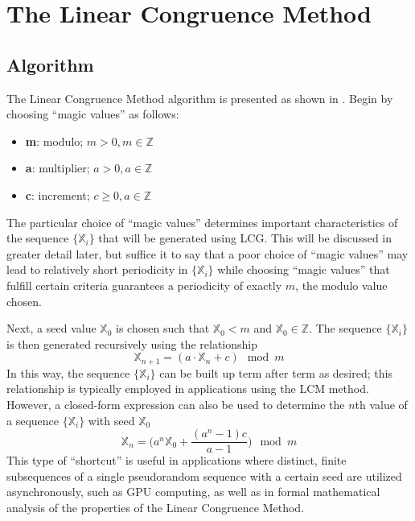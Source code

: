 \documentclass{article}
\theoremstyle{break}
\begin{document}
\section{The Linear Congruence Method}
\subsection{Algorithm}
The Linear Congruence Method algorithm is presented as shown in \autocite{hull_random_1962}. Begin by choosing ``magic values'' as follows:
\begin{itemize}
\item \textbf{m}: modulo; $m > 0, m \in \mathbb{Z}$ 
\item \textbf{a}: multiplier; $a > 0, a \in \mathbb{Z}$
\item \textbf{c}: increment; $c \geq 0, a \in \mathbb{Z}$
\end{itemize}
The particular choice of ``magic values'' determines important characteristics of the sequence $\{\mathbb{X}_i\}$ that will be generated using LCG. This will be discussed in greater detail later, but suffice it to say that a poor choice of ``magic values'' may lead to relatively short periodicity in $\{\mathbb{X}_i\}$ while choosing ``magic values'' that fulfill certain criteria guarantees a periodicity of exactly $m$, the modulo value chosen.

Next, a seed value $\mathbb{X}_0$ is chosen such that $\mathbb{X}_0 < m$ and $\mathbb{X}_0 \in \mathbb{Z}$. The sequence $\{\mathbb{X}_i\}$ is then generated recursively using the relationship
\begin{equation} \label{eq:lgp_rec_rel}
\mathbb{X}_{n+1} = (a \cdot \mathbb{X}_{n} + c) \mod m
\end{equation}
In this way, the sequence $\{\mathbb{X}_i\}$ can be built up term after term as desired; this relationship is typically employed in applications using the LCM method. However, a closed-form expression can also be used to determine the $n$th value of a sequence $\{\mathbb{X}_i\}$ with seed $\mathbb{X}_0$
\begin{equation} 
\mathbb{X}_{n} = \Big( a^n \mathbb{X}_0 + \frac{(a^n - 1)c}{a-1} \Big) \mod m 
\end{equation}
This type of ``shortcut'' is useful in applications where  distinct, finite subsequences of a single pseudorandom sequence with a certain seed are utilized asynchronously, such as GPU computing\autocite{_mwc64x_????}, as well as in formal mathematical analysis of the properties of the Linear Congruence Method.
\end{document}
